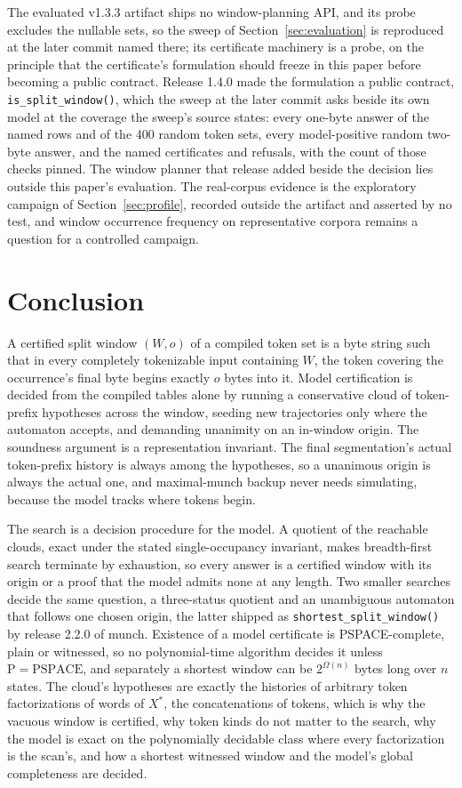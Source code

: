 \documentclass[11pt,a4paper]{article}
\theoremstyle{definition}
\theoremstyle{plain}
\newcommand{\code}[1]{\texttt{#1}}
\begin{document}
The evaluated v1.3.3 artifact ships no window-planning API, and its probe excludes the nullable sets, so the sweep of
Section~\ref{sec:evaluation} is reproduced at the later commit named there; its certificate machinery is a probe, on the
principle that the certificate's formulation should freeze in this paper before becoming a public contract. Release
1.4.0 made the formulation a public contract, \code{is\_split\_window()}, which the sweep at the later commit asks
beside its own model at the coverage the sweep's source states: every one-byte answer of the named rows and of the 400
random token sets, every model-positive random two-byte answer, and the named certificates and refusals, with the count
of those checks pinned. The window planner that release added beside the decision lies outside this paper's evaluation.
The real-corpus evidence is the exploratory campaign of Section~\ref{sec:profile}, recorded outside the artifact and
asserted by no test, and window occurrence frequency on representative corpora remains a question for a controlled
campaign.

\section{Conclusion}
\label{sec:conclusion}

A certified split window $(W, o)$ of a compiled token set is a byte string such that in every completely tokenizable
input containing $W$, the token covering the occurrence's final byte begins exactly $o$ bytes into it. Model
certification is decided from the compiled tables alone by running a conservative cloud of token-prefix hypotheses
across the window, seeding new trajectories only where the automaton accepts, and demanding unanimity on an in-window
origin. The soundness argument is a representation invariant. The final segmentation's actual token-prefix history is
always among the hypotheses, so a unanimous origin is always the actual one, and maximal-munch backup never needs
simulating, because the model tracks where tokens begin.

The search is a decision procedure for the model. A quotient of the reachable clouds, exact under the stated
single-occupancy invariant, makes breadth-first search terminate by exhaustion, so every answer is a certified window
with its origin or a proof that the model admits none at any length. Two smaller searches decide the same question, a
three-status quotient and an unambiguous automaton that follows one chosen origin, the latter shipped as
\code{shortest\_split\_window()} by release 2.2.0 of munch. Existence of a model certificate is PSPACE-complete, plain
or witnessed, so no polynomial-time algorithm decides it unless $\mathrm{P} = \mathrm{PSPACE}$, and separately a
shortest window can be $2^{\Omega(n)}$ bytes long over $n$ states. The cloud's hypotheses are exactly the histories of
arbitrary token factorizations of words of $X^*$, the concatenations of tokens, which is why the vacuous window is
certified, why token kinds do not matter to the search, why the model is exact on the polynomially decidable class where
every factorization is the scan's, and how a shortest witnessed window and the model's global completeness are decided.
\end{document}
